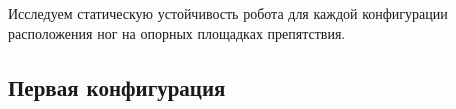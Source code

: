 %

Исследуем статическую устойчивость робота для каждой конфигурации расположения ног на опорных площадках препятствия. 


\subsection{Первая конфигурация}




